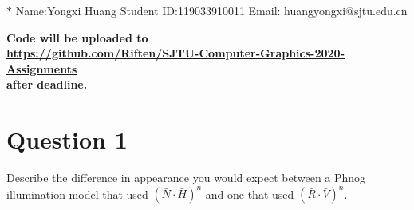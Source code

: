\documentclass[12pt,a4paper]{article}
\theoremstyle{definition}
\numberwithin{equation}{section}
\numberwithin{figure}{section}
\begin{document}
\noindent

\noindent{}
\begin{center}

\footnotesize{\color{blue}$*$ Name:Yongxi Huang  \quad Student ID:119033910011 \quad Email: huangyongxi@sjtu.edu.cn}
\end{center}

\noindent\textbf{Code will be uploaded to \\
	\url{https://github.com/Riften/SJTU-Computer-Graphics-2020-Assignments}\\
	 after deadline.}

\section{Question 1}
Describe the difference in appearance you would expect between a Phnog illumination model that used $(\bar{N}\cdot \bar{H})^n$ and one that used $(\bar{R}\cdot \bar{V})^n$.
\end{document}
